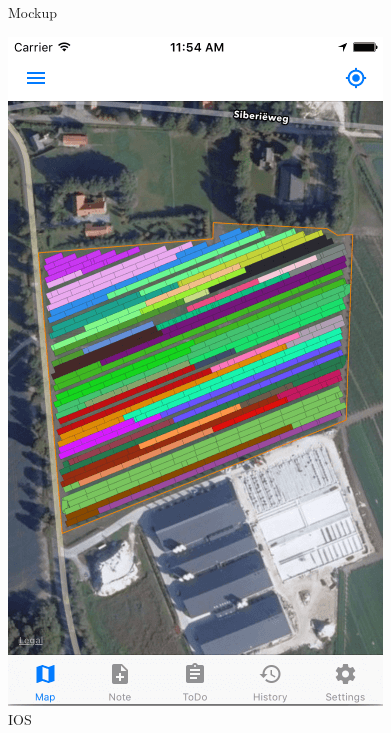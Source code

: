 \documentclass[12pt]{article}
\begin{document}
\begin{figure}[ht]
	\caption{Mockup}
	\endminipage\hfill
	\centering
	\includegraphics[width=\linewidth, height=0.4\textheight, keepaspectratio=true, frame]{screenshots/GruttoIos.png}
	\caption{IOS}
	\endminipage\hfill
	\centering

\end{figure}
\end{document}
